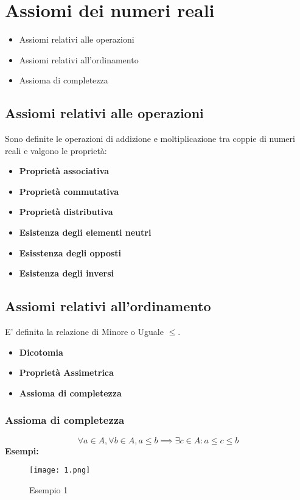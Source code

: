 \section{Assiomi dei numeri reali}
\begin{itemize}
    \item Assiomi relativi alle operazioni
    \item Assiomi relativi all'ordinamento
    \item Assioma di completezza
\end{itemize}

\subsection{Assiomi relativi alle operazioni}
Sono definite le operazioni di addizione e moltiplicazione tra coppie di numeri
reali e valgono le proprietà:
\begin{itemize}
    \item \textbf{Proprietà associativa}
    \item \textbf{Proprietà commutativa}
    \item \textbf{Proprietà distributiva}
    \item \textbf{Esistenza degli elementi neutri}
    \item \textbf{Esisstenza degli opposti}
    \item \textbf{Esistenza degli inversi}
\end{itemize}

\subsection{Assiomi relativi all'ordinamento}
E' definita la relazione di Minore o Uguale $\leq$.
\begin{itemize}
    \item \textbf{Dicotomia}
    \item \textbf{Proprietà Assimetrica}
    \item \textbf{Assioma di completezza}
\end{itemize}

\subsubsection{Assioma di completezza}
\[
    \forall a \in A, \forall b \in A, a \leq b  \implies \exists c \in A : a \leq c \leq b
\]
\textbf{Esempi:}\\
\begin{figure}[h]
    \centering
    \texttt{[image: 1.png]}
    \caption{Esempio 1}
    \label{fig:1}
\end{figure}


